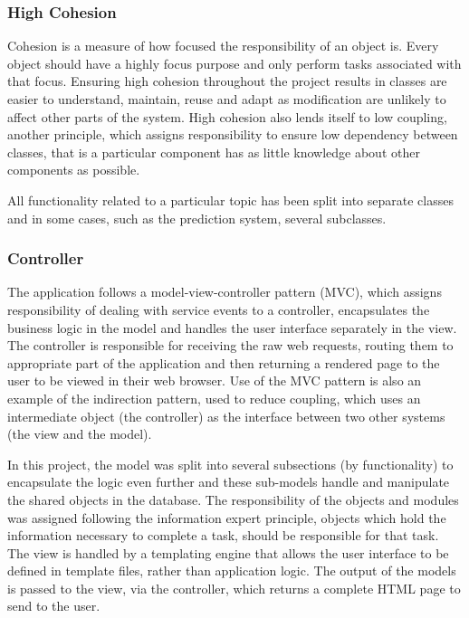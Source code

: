 \subsubsection{High Cohesion}
Cohesion is a measure of how focused the responsibility of an object is. Every object should have a highly focus purpose and only perform tasks associated with that focus. Ensuring high cohesion throughout the project results in classes are easier to understand, maintain, reuse and adapt as modification are unlikely to affect other parts of the system. High cohesion also lends itself to low coupling, another principle, which assigns responsibility to ensure low dependency between classes, that is a particular component has as little knowledge about other components as possible.

All functionality related to a particular topic has been split into separate classes and in some cases, such as the prediction system, several subclasses.

\subsubsection{Controller}
The application follows a model-view-controller pattern (MVC), which assigns responsibility of dealing with service events to a controller, encapsulates the business logic in the model and handles the user interface separately in the view. The controller is responsible for receiving the raw web requests, routing them to appropriate part of the application and then returning a rendered page to the user to be viewed in their web browser. Use of the MVC pattern is also an example of the indirection pattern, used to reduce coupling, which uses an intermediate object (the controller) as the interface between two other systems (the view and the model).

In this project, the model was split into several subsections (by functionality) to encapsulate the logic even further and these sub-models handle and manipulate the shared objects in the database. The responsibility of the objects and modules was assigned following the information expert principle, objects which hold the information necessary to complete a task, should be responsible for that task. The view is handled by a templating engine that allows the user interface to be defined in template files, rather than application logic. The output of the models is passed to the view, via the controller, which returns a complete HTML page to send to the user.

